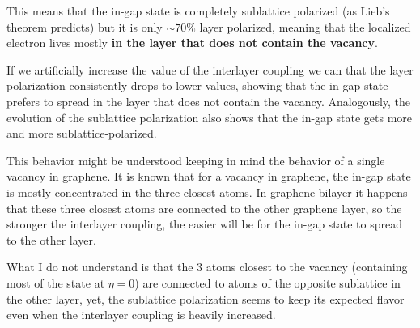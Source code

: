 This means that the in-gap state is completely sublattice polarized (as Lieb's theorem predicts) but it is only $\sim70\%$ layer polarized, meaning that the localized electron lives mostly \textbf{in the layer that does not contain the vacancy}.

If we artificially increase the value of the interlayer coupling we can that the layer polarization consistently drops to lower values, showing that the in-gap state prefers to spread in the layer that does not contain the vacancy. Analogously, the evolution of the sublattice polarization also shows that the in-gap state gets more and more sublattice-polarized.

This behavior might be understood keeping in mind the behavior of a single vacancy in graphene. It is known that for a vacancy in graphene, the in-gap state is mostly concentrated in the three closest atoms. In graphene bilayer it happens that these three closest atoms are connected to the other graphene layer, so the stronger the interlayer coupling, the easier will be for the in-gap state to spread to the other layer.

What I do not understand is that the 3 atoms closest to the vacancy (containing most of the state at $\eta=0$) are connected to atoms of the opposite sublattice in the other layer, yet, the sublattice polarization seems to keep its expected flavor even when the interlayer coupling is heavily increased.















